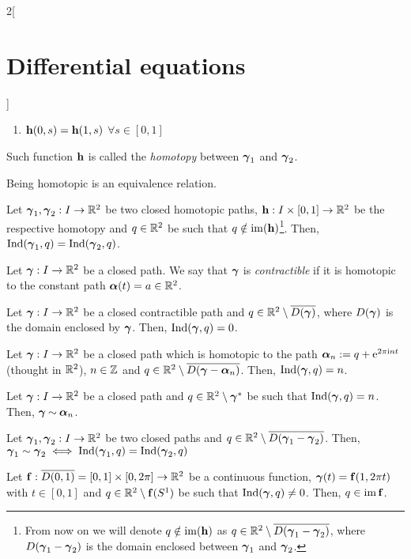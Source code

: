 \documentclass[../../../main.tex]{subfiles}
\begin{document}
\begin{multicols}{2}[\section{Differential equations}]
\begin{definition}
\begin{enumerate}
      \item $\vf{h}(0,s)=\vf{h}(1,s)$ $\forall s\in [0,1]$
    \end{enumerate}
    Such function $\vf{h}$ is called the \emph{homotopy} between $\vf\gamma_1$ and $\vf\gamma_2$.
  \end{definition}
  \begin{lemma}
    Being homotopic is an equivalence relation.
  \end{lemma}
  \begin{proposition}
    Let $\vf\gamma_1,\vf\gamma_2:I\rightarrow\RR^2$ be two closed homotopic paths, $\vf{h}:I\times[0,1]\rightarrow\RR^2$ be the respective homotopy and $q\in\RR^2$ be such that $q\notin \im(\vf{h})$\footnote{From now on we will denote $q\notin \im(\vf{h})$ as $q\in\RR^2\setminus \overline{D(\vf\gamma_1-\vf\gamma_2)}$, where $D(\vf\gamma_1-\vf\gamma_2)$ is the domain enclosed between $\vf\gamma_1$ and $\vf\gamma_2$.}. Then, $\Ind(\vf\gamma_1,q)=\Ind(\vf\gamma_2,q)$.
  \end{proposition}
  \begin{definition}
    Let $\vf\gamma:I\rightarrow\RR^2$ be a closed path. We say that $\vf\gamma$ is \emph{contractible} if it is homotopic to the constant path ${\vf\alpha}(t)=a\in\RR^2$.
  \end{definition}
  \begin{proposition}
    Let $\vf\gamma:I\rightarrow\RR^2$ be a closed contractible path and $q\in\RR^2\setminus \overline{D(\vf\gamma)}$, where $D(\vf\gamma)$ is the domain enclosed by $\vf\gamma$. Then, $\Ind(\vf\gamma,q)=0$.
  \end{proposition}
  \begin{proposition}
    Let $\vf\gamma:I\rightarrow\RR^2$ be a closed path which is homotopic to the path $\vf\alpha_n:=q+\exp{2\pi\ii n t}$ (thought in $\RR^2$), $n\in\ZZ$ and $q\in\RR^2\setminus \overline{D(\vf\gamma-\vf\alpha_n)}$. Then, $\Ind(\vf\gamma,q)=n$.
  \end{proposition}
  \begin{proposition}
    Let $\vf\gamma:I\rightarrow\RR^2$ be a closed path and $q\in\RR^2\setminus\vf\gamma^*$ be such that $\Ind(\vf\gamma,q)=n$. Then, $\vf\gamma\homotop\vf\alpha_n$.
  \end{proposition}
  \begin{theorem}
    Let $\vf\gamma_1,\vf\gamma_2:I\rightarrow\RR^2$ be two closed paths and $q\in\RR^2\setminus \overline{D(\vf\gamma_1-\vf\gamma_2)}$. Then, $\vf\gamma_1\sim\vf\gamma_2\iff\Ind(\vf\gamma_1,q)=\Ind(\vf\gamma_2,q)$
  \end{theorem}
  \begin{theorem}
    Let $\vf{f}:\overline{D(0,1)}=[0,1]\times[0,2\pi]\rightarrow\RR^2$ be a continuous function, $\vf\gamma(t)=\vf{f}(1,2\pi t)$ with $t\in[0,1]$ and $q\in\RR^2\setminus \vf{f}(S^1)$ be such that $\Ind(\vf\gamma,q)\ne 0$. Then, $q\in \im\vf{f}$.
  \end{theorem}

\end{multicols}
\end{document}
